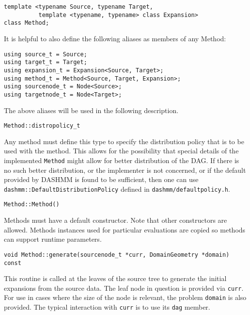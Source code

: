 \begin{lstlisting}
template <typename Source, typename Target,
          template <typename, typename> class Expansion>
class Method;
\end{lstlisting}

\noindent It is helpful to also define the following aliases as members of
any Method:

\begin{lstlisting}
using source_t = Source;
using target_t = Target;
using expansion_t = Expansion<Source, Target>;
using method_t = Method<Source, Target, Expansion>;
using sourcenode_t = Node<Source>;
using targetnode_t = Node<Target>;
\end{lstlisting}

\noindent The above aliases will be used in the following description.

\begin{lstlisting}
Method::distropolicy_t
\end{lstlisting}


Any method must define this type to specify the distribution policy that is to
be used with the method. This allows for the possibility that special details
of the implemented \texttt{Method} might allow for better distribution of the
DAG. If there is no such better distribution, or the implementer is not
concerned, or if the default provided by DASHMM is found to be sufficient, then
one can use \texttt{dashmm::DefaultDistributionPolicy} defined in
\texttt{dashmm/defaultpolicy.h}.

\begin{lstlisting}
Method::Method()
\end{lstlisting}


Methods must have a default constructor. Note that other constructors are
allowed. Methods instances used for particular evaluations are copied so
methods can support runtime parameters.

\begin{lstlisting}
void Method::generate(sourcenode_t *curr, DomainGeometry *domain) const
\end{lstlisting}


This routine is called at the leaves of the source tree to generate the initial
expansions from the source data. The leaf node in question is provided via
\texttt{curr}. For use in cases where the size of the node is relevant,
the problem \texttt{domain} is also provided. The typical interaction with
\texttt{curr} is to use its \texttt{dag} member.

